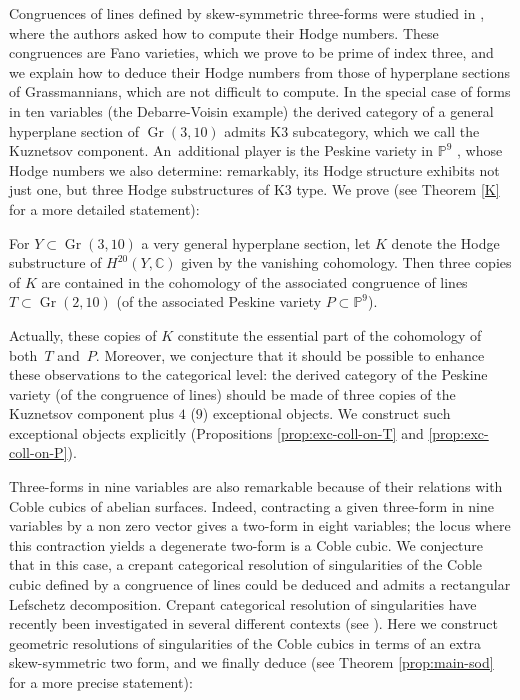 \documentclass[JEP,XML,SOM,Unicode,NoEqCountersInSection]{cedram}
\theoremstyle{plain}
\theoremstyle{definition}
\DeclareMathOperator{\Gr}{Gr}
\newcommand{\CC}{\mathbb{C}}
\newcommand{\PP}{\mathbb{P}}
\begin{document}
Congruences of lines defined by skew-symmetric three-forms were studied in \cite{dpfmr},
where the authors asked how to compute their Hodge numbers. These congruences are Fano
varieties, which we prove to be prime of index three, and we explain how to deduce their
Hodge numbers from those of hyperplane sections of \hbox{Grassmannians}, which are not difficult
to compute. In the special case
of forms in ten variables (the Debarre-Voisin example) the derived category of a general hyperplane section of $\Gr(3,10)$
\hbox{admits} K3 subcategory, which we call the Kuznetsov component. An~additional player
is the Peskine variety in $\PP^9$ \cite{dpfmr}, whose Hodge numbers we also determine: remarkably, its
Hodge structure exhibits not just one, but three Hodge substructures of K3 type.
We prove (see Theorem \ref{K} for a more detailed statement):

\begin{theorem*}
For $Y\subset \Gr(3,10)$ a very general hyperplane section, let $K$ denote the Hodge substructure of $H^{20}(Y,\CC)$ given by the vanishing cohomology. Then three copies of $K$ are contained
in the cohomology of the associated congruence of lines $T\subset \Gr(2,10)$ (\resp of the associated Peskine variety $P\subset\PP^9$).
\end{theorem*}

Actually, these copies of $K$ constitute the essential part of the cohomology
of both~$T$ and~$P$.
Moreover, we conjecture that it should be possible to enhance these observations to the categorical
level: the derived category of the Peskine variety (\resp of the congruence of lines)
should be made of three copies of the Kuznetsov component plus $4$ (\resp $9$) exceptional
objects. We construct such exceptional objects explicitly (Propositions \ref{prop:exc-coll-on-T} and \ref{prop:exc-coll-on-P}).

Three-forms in nine variables are also remarkable because of their relations with
Coble cubics of abelian surfaces. Indeed, contracting a given
three-form in nine variables by a non zero vector gives a two-form in eight
variables; the locus where this contraction yields a degenerate two-form is
a Coble cubic. We conjecture that in this case, a crepant categorical
resolution of singularities of the Coble cubic defined by a congruence of lines could be deduced and admits a rectangular Lefschetz decomposition. Crepant categorical resolution of singularities
have recently been investigated in several different contexts (see \cite{kuz-lefschetz,
leuschke, lunts}). Here we construct geometric resolutions of
singularities of the Coble cubics in terms of an extra skew-symmetric two form,
and we finally deduce
(see Theorem \ref{prop:main-sod} for a more precise statement):
\end{document}
